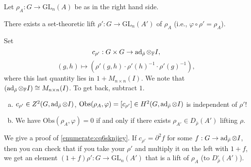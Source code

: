 \documentclass[reqno]{amsart} 
\numberwithin{theorem}{section}
\numberwithin{equation}{section}
\numberwithin{exercise}{section}
\begin{document}
Let $\rho_A : G \rightarrow \mathrm{GL}_n(A)$ be as in the right hand side.
\begin{fact}\label{fact:cq6thpec2o}
  There exists a set-theoretic lift $\rho ' : G \rightarrow \mathrm{GL}_n(A')$ of $\rho_A$ (i.e., $\varphi \circ \rho ' = \rho_A$).
\end{fact}
\begin{definition}\label{definition:cq6thpeaqx}
  Set
  \begin{equation*}
    c_{\rho '} : G \times G \rightarrow \operatorname{ad}_{\bar{\rho}} \otimes_{\mathbb{F}} I,
  \end{equation*}
  \begin{equation*}
    (g, h) \mapsto(\rho '(g, h) \cdot \rho '(h)^{-1} \cdot \rho '(g)^{-1}),
  \end{equation*}
  where this last quantity lies in $1 + M_{n \times n}(I)$.  We note that $(\operatorname{ad}_{\bar{\rho}} \otimes_{\mathbb{F}} I) \cong M_{n \times n}(I)$.  To get back, subtract $1$.
\end{definition}
\begin{proposition}\label{proposition:cq6thpd7zv}
  \begin{enumerate}[(a)]
  \item\label{enumerate:cq6sknji3b} $c_{\rho '} \in Z^2(G, \operatorname{ad}_{\bar{\rho}} \otimes I)$, $\mathrm{Obs}(\rho_A, \varphi) =[ c_{\rho '} ] \in H^2(G, \operatorname{ad}_{\bar{\rho}} \otimes I)$ is independent of $\rho '$!
  \item\label{enumerate:cq6sknjiey} We have $\mathrm{Obs}(\rho_A, \varphi) = 0$ if and only if there exists $\rho_{A'} \in D_{\bar{\rho}}(A')$ lifting $\rho$.
  \end{enumerate}
\end{proposition}
We give a proof of \eqref{enumerate:cq6sknjiey}.  If $c_{\rho '} = \partial^2 f$ for some $f : G \rightarrow \operatorname{ad}_{\bar{\rho}} \otimes I$, then you can check that if you take your $\rho '$ and multiply it on the left with $1 + f$, we get an element $(1 + f) \rho ' : G \rightarrow \mathrm{GL}_n(A')$ that is a lift of $\rho_A$ (to $D_{\bar{\rho}}^{\square}(A')$).
\end{document}
